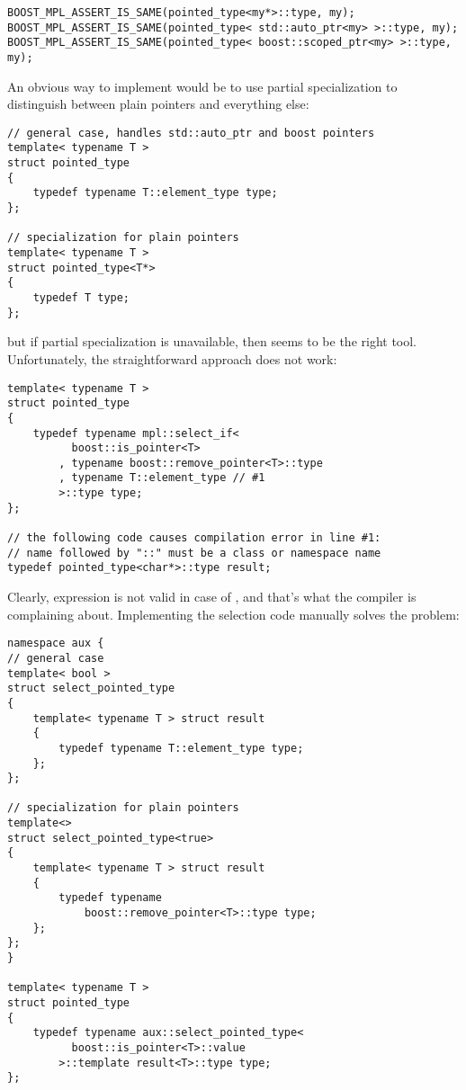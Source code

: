 \documentclass{kapproc}
\begin{document}
{\small
\begin{codesamp}\begin{verbatim}
BOOST_MPL_ASSERT_IS_SAME(pointed_type<my*>::type, my);
BOOST_MPL_ASSERT_IS_SAME(pointed_type< std::auto_ptr<my> >::type, my);
BOOST_MPL_ASSERT_IS_SAME(pointed_type< boost::scoped_ptr<my> >::type, my);
\end{verbatim}
\end{codesamp}
}

An obvious way to implement  would be to 
use partial specialization to distinguish between plain 
pointers and everything else:

{\small
\begin{codesamp}\begin{verbatim}
// general case, handles std::auto_ptr and boost pointers
template< typename T >
struct pointed_type
{
    typedef typename T::element_type type;
};

// specialization for plain pointers
template< typename T >
struct pointed_type<T*>
{
    typedef T type;
};
\end{verbatim}
\end{codesamp}
}

but if partial specialization is unavailable, then 
 seems to be the right tool. Unfortunately,
the straightforward approach does not work:

{\small
\begin{codesamp}\begin{verbatim}
template< typename T >
struct pointed_type
{
    typedef typename mpl::select_if<
          boost::is_pointer<T>
        , typename boost::remove_pointer<T>::type
        , typename T::element_type // #1
        >::type type;
};

// the following code causes compilation error in line #1:
// name followed by "::" must be a class or namespace name
typedef pointed_type<char*>::type result;
\end{verbatim}
\end{codesamp}
}

Clearly,  expression is not 
valid in case of , and that's what the 
compiler is complaining about. Implementing the selection code 
manually solves the problem: 

{\small
\begin{codesamp}\begin{verbatim}
namespace aux {
// general case
template< bool >
struct select_pointed_type
{
    template< typename T > struct result
    {
        typedef typename T::element_type type;
    };
};

// specialization for plain pointers
template<>
struct select_pointed_type<true>
{
    template< typename T > struct result
    {
        typedef typename
            boost::remove_pointer<T>::type type;
    };
};
}

template< typename T >
struct pointed_type
{
    typedef typename aux::select_pointed_type<
          boost::is_pointer<T>::value
        >::template result<T>::type type;
};
\end{verbatim}
\end{codesamp}
}
\end{document}
